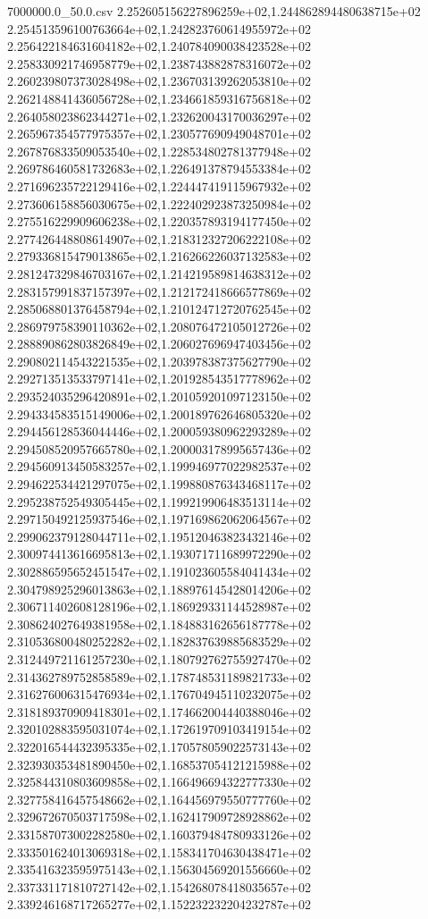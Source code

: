 \begin{filecontents*}{7000000.0_50.0.csv}
2.252605156227896259e+02,1.244862894480638715e+02
2.254513596100763664e+02,1.242823760614955972e+02
2.256422184631604182e+02,1.240784090038423528e+02
2.258330921746958779e+02,1.238743882878316072e+02
2.260239807373028498e+02,1.236703139262053810e+02
2.262148841436056728e+02,1.234661859316756818e+02
2.264058023862344271e+02,1.232620043170036297e+02
2.265967354577975357e+02,1.230577690949048701e+02
2.267876833509053540e+02,1.228534802781377948e+02
2.269786460581732683e+02,1.226491378794553384e+02
2.271696235722129416e+02,1.224447419115967932e+02
2.273606158856030675e+02,1.222402923873250984e+02
2.275516229909606238e+02,1.220357893194177450e+02
2.277426448808614907e+02,1.218312327206222108e+02
2.279336815479013865e+02,1.216266226037132583e+02
2.281247329846703167e+02,1.214219589814638312e+02
2.283157991837157397e+02,1.212172418666577869e+02
2.285068801376458794e+02,1.210124712720762545e+02
2.286979758390110362e+02,1.208076472105012726e+02
2.288890862803826849e+02,1.206027696947403456e+02
2.290802114543221535e+02,1.203978387375627790e+02
2.292713513533797141e+02,1.201928543517778962e+02
2.293524035296420891e+02,1.201059201097123150e+02
2.294334583515149006e+02,1.200189762646805320e+02
2.294456128536044446e+02,1.200059380962293289e+02
2.294508520957665780e+02,1.200003178995657436e+02
2.294560913450583257e+02,1.199946977022982537e+02
2.294622534421297075e+02,1.199880876343468117e+02
2.295238752549305445e+02,1.199219906483513114e+02
2.297150492125937546e+02,1.197169862062064567e+02
2.299062379128044711e+02,1.195120463823432146e+02
2.300974413616695813e+02,1.193071711689972290e+02
2.302886595652451547e+02,1.191023605584041434e+02
2.304798925296013863e+02,1.188976145428014206e+02
2.306711402608128196e+02,1.186929331144528987e+02
2.308624027649381958e+02,1.184883162656187778e+02
2.310536800480252282e+02,1.182837639885683529e+02
2.312449721161257230e+02,1.180792762755927470e+02
2.314362789752858589e+02,1.178748531189821733e+02
2.316276006315476934e+02,1.176704945110232075e+02
2.318189370909418301e+02,1.174662004440388046e+02
2.320102883595031074e+02,1.172619709103419154e+02
2.322016544432395335e+02,1.170578059022573143e+02
2.323930353481890450e+02,1.168537054121215988e+02
2.325844310803609858e+02,1.166496694322777330e+02
2.327758416457548662e+02,1.164456979550777760e+02
2.329672670503717598e+02,1.162417909728928862e+02
2.331587073002282580e+02,1.160379484780933126e+02
2.333501624013069318e+02,1.158341704630438471e+02
2.335416323595975143e+02,1.156304569201556660e+02
2.337331171810727142e+02,1.154268078418035657e+02
2.339246168717265277e+02,1.152232232204232787e+02

\end{filecontents*}
